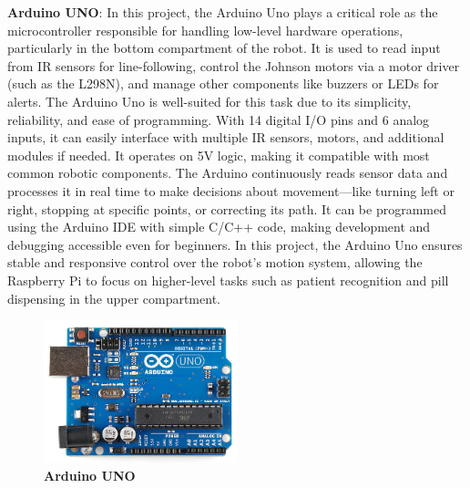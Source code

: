 \textbf{Arduino UNO}: In this project, the Arduino Uno plays a critical role as the microcontroller responsible for handling low-level hardware operations, particularly in the bottom compartment of the robot. It is used to read input from IR sensors for line-following, control the Johnson motors via a motor driver (such as the L298N), and manage other components like buzzers or LEDs for alerts. The Arduino Uno is well-suited for this task due to its simplicity, reliability, and ease of programming. With 14 digital I/O pins and 6 analog inputs, it can easily interface with multiple IR sensors, motors, and additional modules if needed. It operates on 5V logic, making it compatible with most common robotic components. The Arduino continuously reads sensor data and processes it in real time to make decisions about movement—like turning left or right, stopping at specific points, or correcting its path. It can be programmed using the Arduino IDE with simple C/C++ code, making development and debugging accessible even for beginners. In this project, the Arduino Uno ensures stable and responsive control over the robot’s motion system, allowing the Raspberry Pi to focus on higher-level tasks such as patient recognition and pill dispensing in the upper compartment.

\begin{figure}[htbp!]
\centering
\includegraphics[width=0.5\textwidth]{images/fig3.3.png}
\caption{\textbf{Arduino UNO}}
\label{fig:3.3}
\end{figure}

\vspace{1.5\baselineskip} %

